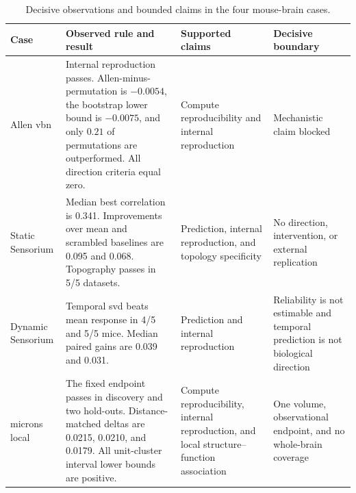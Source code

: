 \begin{table}[t!]
\centering
\caption{Decisive observations and bounded claims in the four mouse-brain cases.}
\label{tab:real-case-summary}
\footnotesize
\renewcommand{\arraystretch}{1.02}
\begin{tabularx}{\textwidth}{@{}p{}p{}p{}Y@{}}
\toprule
Case & Observed rule and result & Supported claims & Decisive boundary \\
\midrule
Allen \acs{vbn} & Internal reproduction passes. Allen-minus-permutation is $-0.0054$, the bootstrap lower bound is $-0.0075$, and only $0.21$ of permutations are outperformed. All direction criteria equal zero. & Compute reproducibility and internal reproduction & Mechanistic claim blocked \\
\addlinespace[2pt]
Static Sensorium & Median best correlation is 0.341. Improvements over mean and scrambled baselines are 0.095 and 0.068. Topography passes in 5/5 datasets. & Prediction, internal reproduction, and topology specificity & No direction, intervention, or external replication \\
\addlinespace[2pt]
Dynamic Sensorium & Temporal \acs{svd} beats mean response in 4/5 and 5/5 mice. Median paired gains are 0.039 and 0.031. & Prediction and internal reproduction & Reliability is not estimable and temporal prediction is not biological direction \\
\addlinespace[2pt]
\acs{microns} local & The fixed endpoint passes in discovery and two hold-outs. Distance-matched deltas are 0.0215, 0.0210, and 0.0179. All unit-cluster interval lower bounds are positive. & Compute reproducibility, internal reproduction, and local structure--function association & One volume, observational endpoint, and no whole-brain coverage \\
\bottomrule
\end{tabularx}
\end{table}

